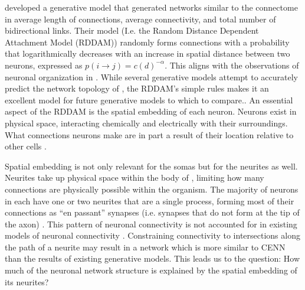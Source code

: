 \cite{Itzhack} developed a generative model that generated networks similar to the \ce connectome in average length of connections, average connectivity, and total number of bidirectional links. 
Their model (I.e. the Random Distance Dependent Attachment Model (RDDAM)) randomly forms connections with a probability that logarithmically decreases with an increase in spatial distance between two neurons, expressed as $p(i \rightarrow j)= c(d)^{- \alpha }$.
This aligns with the observations of neuronal organization in \ce \citep{PerezEscudero}.
While several generative models attempt to accurately predict the network topology of \ce \citep{Costa, Khajezade, Nicosia}, the RDDAM’s simple rules makes it an excellent model for future generative models to which to compare..
An essential aspect of the RDDAM is the spatial embedding of each neuron. 
Neurons exist in physical space, interacting chemically and electrically with their surroundings. 
What connections neurons make are in part a result of their location relative to other cells \citep{Hentschel, Kaiser, PerezEscudero}.

Spatial embedding is not only relevant for the somas but for the neurites as well. 
Neurites take up physical space within the body of \ce, limiting how many connections are physically possible within the organism. 
The majority of neurons in \ce each have one or two neurites that are a single process, forming most of their connections as “en passant” synapses (i.e. synapses that do not form at the tip of the axon) \citep{Durbin, White}. 
This pattern of neuronal connectivity is not accounted for in existing models of \ce neuronal connectivity \citep{Costa, Itzhack, Khajezade, Nicosia}. 
Constraining connectivity to intersections along the path of a neurite may result in a network which is more similar to CENN than the results of existing generative models. 
This leads us to the question: How much of the \ce neuronal network structure is explained by the spatial embedding of its neurites?